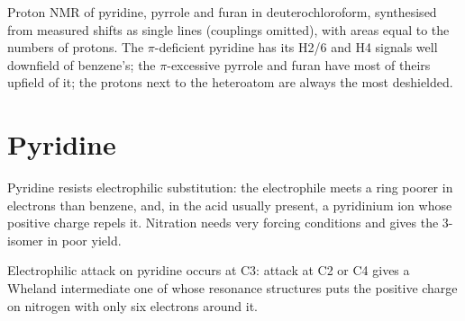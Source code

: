 \begin{omfigure}

{\small Proton NMR of pyridine, pyrrole and furan in deuterochloroform,
synthesised from measured shifts as single lines (couplings omitted), with
areas equal to the numbers of protons. The $\pi$-deficient pyridine has its H2/6 and H4
signals well downfield of benzene's; the $\pi$-excessive pyrrole and furan have most
of theirs upfield of it; the protons next to the heteroatom are always the most
deshielded.}
\end{omfigure}

\section{Pyridine}

Pyridine resists electrophilic substitution: the electrophile meets a ring
poorer in electrons than benzene, and, in the acid usually present, a
pyridinium ion whose positive charge repels it. Nitration needs very forcing
conditions and gives the 3-isomer in poor yield.

\begin{proposition}\label{prop:b3:heterocycles:pyridine-c3}
Electrophilic attack on pyridine occurs at C3: attack at C2 or C4 gives a
Wheland intermediate one of whose resonance structures puts the positive
charge on nitrogen with only six electrons around it.
\end{proposition}

